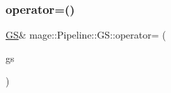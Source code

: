 \hypertarget{structmage_1_1_pipeline_1_1_g_s_af7ed4aa0e59d3cac1a9664eb0809c4aa}{}\label{structmage_1_1_pipeline_1_1_g_s_af7ed4aa0e59d3cac1a9664eb0809c4aa} 
\subsubsection{\texorpdfstring{operator=()}{operator=()}\hspace{0.1cm}{\footnotesize\ttfamily [2/2]}}
{\footnotesize\ttfamily \hyperlink{structmage_1_1_pipeline_1_1_g_s}{GS}\& mage\+::\+Pipeline\+::\+G\+S\+::operator= (\begin{DoxyParamCaption}\item[{\hyperlink{structmage_1_1_pipeline_1_1_g_s}{GS} \&\&}]{gs }\end{DoxyParamCaption})\hspace{0.3cm}{\ttfamily [delete]}}

